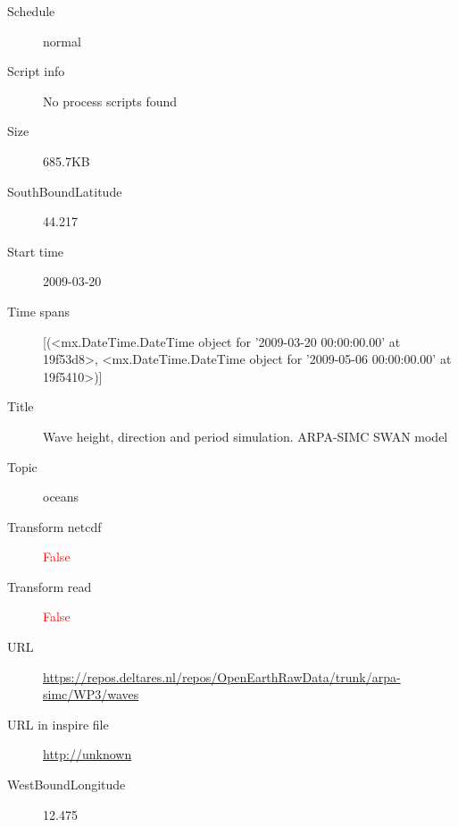 \documentclass[9]{report}
\begin{document}
\begin{description}
\begin{verbatim}
\end{verbatim}
  \item[Schedule] normal
  \item[Script info] No process scripts found
  \item[Size] 685.7KB
  \item[SouthBoundLatitude] 44.217
  \item[Start time] 2009-03-20
  \item[Time spans] [(<mx.DateTime.DateTime object for '2009-03-20 00:00:00.00' at 19f53d8>, <mx.DateTime.DateTime object for '2009-05-06 00:00:00.00' at 19f5410>)]
  \item[Title]  Wave height, direction and period simulation. ARPA-SIMC SWAN model 
  \item[Topic] oceans
  \item[Transform netcdf] \textcolor{red}{False}
  \item[Transform read] \textcolor{red}{False}
  \item[URL] \href{https://repos.deltares.nl/repos/OpenEarthRawData/trunk/arpa-simc/WP3/waves}{https://repos.deltares.nl/repos/OpenEarthRawData/trunk/arpa-simc/WP3/waves}
  \item[URL in inspire file] \href{http://unknown}{http://unknown}
  \item[WestBoundLongitude] 12.475
\end{description}
\end{document}
